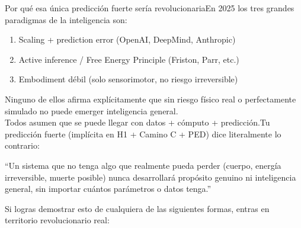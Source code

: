 Por qué esa única predicción fuerte sería revolucionariaEn 2025 los tres
grandes paradigmas de la inteligencia son:

\begin{enumerate}
\def\labelenumi{\arabic{enumi}.}
\item
  Scaling + prediction error (OpenAI, DeepMind, Anthropic)
\item
  Active inference / Free Energy Principle (Friston, Parr, etc.)
\item
  Embodiment débil (solo sensorimotor, no riesgo irreversible)
\end{enumerate}

Ninguno de ellos afirma explícitamente que sin riesgo físico real o
perfectamente simulado no puede emerger inteligencia general.\\
Todos asumen que se puede llegar con datos + cómputo + predicción.Tu
predicción fuerte (implícita en H1 + Camino C + PED) dice literalmente
lo contrario:

``Un sistema que no tenga algo que realmente pueda perder (cuerpo,
energía irreversible, muerte posible) nunca desarrollará propósito
genuino ni inteligencia general, sin importar cuántos parámetros o datos
tenga.''

Si logras demostrar esto de cualquiera de las siguientes formas, entras
en territorio revolucionario real:

